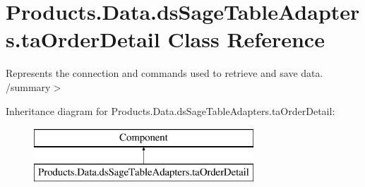 \hypertarget{class_products_1_1_data_1_1ds_sage_table_adapters_1_1ta_order_detail}{}\section{Products.\+Data.\+ds\+Sage\+Table\+Adapters.\+ta\+Order\+Detail Class Reference}
\label{class_products_1_1_data_1_1ds_sage_table_adapters_1_1ta_order_detail}


Represents the connection and commands used to retrieve and save data. /summary$>$  


Inheritance diagram for Products.\+Data.\+ds\+Sage\+Table\+Adapters.\+ta\+Order\+Detail\+:\begin{figure}[H]
\begin{center}
\leavevmode
\includegraphics[height=2.000000cm]{class_products_1_1_data_1_1ds_sage_table_adapters_1_1ta_order_detail}
\end{center}
\end{figure}
